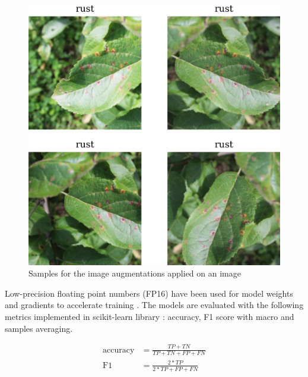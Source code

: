 \documentclass[conference]{IEEEtran}
\begin{document}
\begin{figure}[h]
    \centerline{\includegraphics[width = 0.45 \textwidth]{image-aug-3x3.png}}
    \caption{Samples for the image augmentations applied on an image}
    \label{fig:image-aug}
\end{figure}

Low-precision floating point numbers (FP16) have been used 
for model weights and gradients to accelerate training 
\cite{Micikevicius2018} \cite{BagOfTricks}.
The models are evaluated with the following metrics implemented 
in scikit-learn library \cite{sklearn_api}: 
accuracy, F1 score with macro and samples averaging.

\begin{align*}
    \text{accuracy} &= \frac{TP+TN}{TP+TN+FP+FN} \\
    \text{F1} &= \frac{2*TP}{2*TP+FP+FN}
\end{align*}
\end{document}

